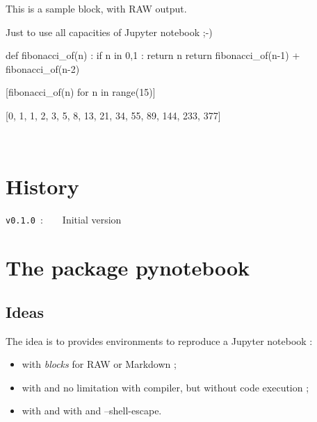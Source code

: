 \documentclass[english,11pt,a4paper]{article}
\begin{document}
\begin{NotebookRaw}{\linewidth}
This is a sample block, with RAW output.

Just to use all capacities of Jupyter notebook ;-)
\end{NotebookRaw}

\begin{NotebookIn}{\linewidth}
def fibonacci_of(n) :
	if n in {0,1} :
		return n
	return fibonacci_of(n-1) + fibonacci_of(n-2)
	
[fibonacci_of(n) for n in range(15)]
\end{NotebookIn}

\begin{NotebookOut}{\linewidth}
[0, 1, 1, 2, 3, 5, 8, 13, 21, 34, 55, 89, 144, 233, 377]
\end{NotebookOut}

%
%

\vfill~

\section{History}

\verb|v0.1.0|~:~~~~Initial version

\vspace*{15mm}

\pagebreak

\section{The package pynotebook}

\subsection{Ideas}

The idea is to provides environments to reproduce a Jupyter notebook :

\begin{itemize}
	\item with \textit{blocks} for \textsf{RAW} or \textsf{Markdown} ;
	\item with  and no limitation with compiler, but without code execution ;
	\item with  and  with  and \textsf{--shell-escape}.
\end{itemize}
\end{document}
